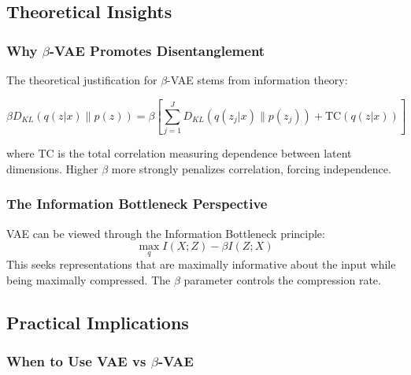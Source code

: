 \documentclass[conference]{IEEEtran}
\begin{document}
\subsection{Theoretical Insights}

\subsubsection{Why $\beta$-VAE Promotes Disentanglement}

The theoretical justification for $\beta$-VAE stems from information theory:

\begin{equation}
\beta D_{KL}(q(z|x) \| p(z)) = \beta \left[ \sum_{j=1}^{J} D_{KL}(q(z_j|x) \| p(z_j)) + \text{TC}(q(z|x)) \right]
\end{equation}

where TC is the total correlation measuring dependence between latent dimensions. Higher $\beta$ more strongly penalizes correlation, forcing independence.

\subsubsection{The Information Bottleneck Perspective}

VAE can be viewed through the Information Bottleneck principle:
\begin{equation}
\max_{q} I(X; Z) - \beta I(Z; X)
\end{equation}
This seeks representations that are maximally informative about the input while being maximally compressed. The $\beta$ parameter controls the compression rate.

\subsection{Practical Implications}

\subsubsection{When to Use VAE vs $\beta$-VAE}
\end{document}
